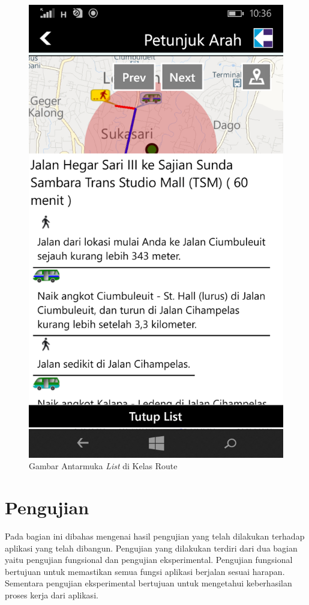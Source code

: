 	\begin{figure}[!h]
		\centering
			\includegraphics[scale=0.25]{Gambar/antarmuka/list_route}
		\caption{Gambar Antarmuka \textit{List} di Kelas Route}
		\label{fig:antarmuka list Route}
	\end{figure}

\newpage

\section{Pengujian}
\label{lab:Pengujian}
\hspace{0.5cm} Pada bagian ini dibahas mengenai hasil pengujian yang telah dilakukan terhadap aplikasi yang telah dibangun. Pengujian yang dilakukan terdiri dari dua bagian yaitu pengujian fungsional dan pengujian eksperimental. Pengujian fungsional bertujuan untuk memastikan semua fungsi aplikasi berjalan sesuai harapan. Sementara pengujian eksperimental bertujuan untuk mengetahui keberhasilan proses kerja dari aplikasi.

